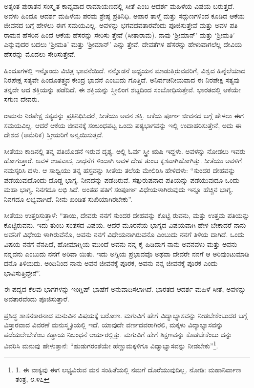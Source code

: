 ಅತ್ಯಂತ ಪುರಾತನ ಸಂಸ್ಕೃತ ಕಾವ್ಯವಾದ ರಾಮಾಯಣದಲ್ಲಿ ಸೀತೆ ಎಂಬ ಆದರ್ಶ ಮಹಿಳೆಯ ವಿಷಯ ಬರುತ್ತದೆ. ಅವಳು ಹಿಂದೂ ಆದರ್ಶ ಮಹಿಳೆಯ ಪರಮ ಶ್ರೇಷ್ಠ ಪ್ರತಿನಿಧಿ. ಅಪಾರ ತಾಳ್ಮೆ ಮತ್ತು ಸದ್ಗುಣಗಳಿಂದ ಕೂಡಿದ ಆಕೆಯ ಜೀವನದ ಬಗ್ಗೆ ಹೇಳಲು ಈಗ ಸಮಯವಿಲ್ಲ. ಅವಳನ್ನು ಭಗವದವತಾರವೆಂದು ಪೂಜಿಸುತ್ತೇವೆ ಮತ್ತು ಅವಳ ಪತಿ ರಾಮನ ಹೆಸರಿನ ಹಿಂದೆ ಆಕೆಯ ಹೆಸರನ್ನು ಸೇರಿಸು ತ್ತೇವೆ (ಸೀತಾರಾಮ). ನಾವು ‘ಶ‍್ರೀಮಾನ್’ ಮತ್ತು ‘ಶ‍್ರೀಮತಿ’ ಎನ್ನುವುದರ ಬದಲು ‘ಶ‍್ರೀಮತಿ’ ಮತ್ತು ‘ಶ‍್ರೀಮಾನ್’ ಎನ್ನು ತ್ತೇವೆ. ದೇವತೆಗಳ ಹೆಸರನ್ನು ಹೇಳುವಾಗಲೆಲ್ಲ ದೇವಿಯ ಹೆಸರನ್ನು ಮೊದಲು ಸೇರಿಸುತ್ತೇವೆ.

ಹಿಂದೂಗಳಲ್ಲಿ ಇನ್ನೊಂದು ವಿಚಿತ್ರ ಭಾವನೆಯಿದೆ. ನನ್ನೊಡನೆ ಅಧ್ಯಯನ ಮಾಡುತ್ತಿರುವವರಿಗೆ, ವಿಶ್ವದ ಹಿನ್ನೆಲೆಯಾದ ನಿರಪೇಕ್ಷ ಸತ್ಯವೇ ಹಿಂದೂತತ್ತ್ವದ ಕೇಂದ್ರ ಭಾವನೆ ಎಂಬುದು ಗೊತ್ತಿದೆ. ಅನಿರ್ವಚನೀಯವಾದ ಈ ನಿರಪೇಕ್ಷ ಸತ್ಯವು ತನ್ನದೇ ಆದ ಶಕ್ತಿಯನ್ನು ಪಡೆದಿದೆ. ಈ ಶಕ್ತಿಯನ್ನು ಸ್ತ್ರೀಲಿಂಗ ಶಬ್ದದಿಂದ ಸಂಬೋಧಿಸುತ್ತೇವೆ. ಭಾರತದಲ್ಲಿ ಆಕೆಯೇ ಸಗುಣ ದೇವರು.

ರಾಮನು ನಿರಪೇಕ್ಷ ಸತ್ಯವನ್ನು ಪ್ರತಿನಿಧಿಸಿದರೆ, ಸೀತೆಯು ಅವನ ಶಕ್ತಿ. ಆಕೆಯ ಪೂರ್ಣ ಜೀವನದ ಬಗ್ಗೆ ಹೇಳಲು ಈಗ ಸಮಯವಿಲ್ಲ. ಆದರೆ ಆಕೆಯ ಜೀವನಕ್ಕೆ ಸಂಬಂಧಪಟ್ಟ ಒಂದು ಪಠ್ಯಭಾಗವನ್ನು ಇಲ್ಲಿ ಉದಾಹರಿಸುತ್ತೇನೆ, ಅದು ಈ ದೇಶದ (ಅಮೆರಿಕ) ಸ್ತ್ರೀಯರಿಗೆ ಅನ್ವಯಿಸುತ್ತದೆ.

ಸೀತೆಯು ಕಾಡಿನಲ್ಲಿ ತನ್ನ ಪತಿಯೊಡನೆ ಇರುವ ದೃಶ್ಯ. ಅಲ್ಲಿ ಓರ್ವ ಸ್ತ್ರೀ ಋಷಿ ಇದ್ದಳು. ಅವಳನ್ನು ನೋಡಲು ಇವರು ಹೋಗುತ್ತಾರೆ. ಅವಳ ಉಪವಾಸ, ಸಾಧನೆಗ ಳಿಂದಾಗಿ ಅವಳ ದೇಹ ತುಂಬ ಕೃಶವಾಗಿಹೋಗಿತ್ತು. ಸೀತೆಯು ಅವಳಿಗೆ ನಮಸ್ಕರಿಸಿ ದಳು. ಆ ಸಾಧ್ವಿಯು ತನ್ನ ಹಸ್ತವನ್ನು ಸೀತೆಯ ತಲೆಯ ಮೇಲಿರಿಸಿ ಹೇಳಿದಳು: “ಸುಂದರ ದೇಹವನ್ನು ಪಡೆಯುವುದೊಂದು ದೊಡ್ಡ ಭಾಗ್ಯ. ನೀನದನ್ನು ಪಡೆದಿರುವೆ. ಸತ್ಪುರುಷನಾದ ಪತಿಯನ್ನು ಪಡೆಯುವುದೂ ಒಂದು ಮಹಾ ಭಾಗ್ಯ. ನಿನಗದೂ ಲಭಿ ಸಿದೆ. ಅಂತಹ ಪತಿಗೆ ಸಂಪೂರ್ಣ ವಿಧೇಯಳಾಗಿರುವುದು ಇನ್ನೂ ಹೆಚ್ಚಿನ ಭಾಗ್ಯ. ನಿನಗದೂ ಲಭ್ಯವಾಗಿದೆ. ನೀನು ಖಂಡಿತ ಸುಖಿಯಾಗಿರಬೇಕು”.

ಸೀತೆಯು ಉತ್ತರಿಸುತ್ತಾಳೆ: “ತಾಯಿ, ದೇವರು ನನಗೆ ಸುಂದರ ದೇಹವನ್ನು ಕೊಟ್ಟಿ ರುವನು, ಮತ್ತು ಉತ್ತಮ ಪತಿಯನ್ನು ಕೊಟ್ಟಿರುವನು. ಇದು ತುಂಬ ಸಂತಸದ ವಿಷಯ. ಆದರೆ ಮೂರನೆಯ ಭಾಗ್ಯದ ವಿಷಯವಾಗಿ ಹೇಳ ಬೇಕಾದರೆ ನಾನು ಅವನಿಗೆ ವಿಧೇಯ ಳಾಗಿರುವೆನೊ, ಅವನು ನನಗೆ ವಿಧೇಯನಾಗಿರುವನೊ ಎಂಬುದು ನನಗೆ ತಿಳಿಯ ದಾಗಿದೆ. ಒಂದು ವಿಷಯ ನನಗೆ ನೆನಪಿದೆ, ಹೋಮಾಗ್ನಿಯ ಮುಂದೆ ಅವನು ನನ್ನ ಕೈ ಹಿಡಿದಾಗ ನಾನು ಅವನವಳು ಮತ್ತು ಅವನು ನನ್ನವನು ಎಂಬುದು ನನಗೆ ಅರಿವಾ ಯಿತು. ಇದು ಅಗ್ನಿಯ ಪ್ರಭಾವವೊ ಅಥವಾ ದೇವರೇ ನನಗೆ ಆ ಅರಿವುಂಟುಮಾಡಿ ದನೊ ತಿಳಿಯದು. ಅಂದಿನಿಂದ ನಾನು ಅವನ ಜೀವನಕ್ಕೆ ಪೂರಕ, ಅವನು ನನ್ನ ಜೀವನಕ್ಕೆ ಪೂರಕ ಎಂದು ಭಾವಿಸುತ್ತಿದ್ದೇನೆ”.

ಈ ಪದ್ಯದ ಕೆಲವು ಭಾಗಗಳನ್ನು ಇಂಗ್ಲಿಷ್ ಭಾಷೆಗೆ ಅನುವಾದಿಸಲಾಗಿದೆ. ಭಾರತದ ಆದರ್ಶ ಮಹಿಳೆ ಸೀತೆ, ಅವಳನ್ನು ಅವತಾರವೆಂದು ಪೂಜಿಸುತ್ತಾರೆ.

ಪ್ರಸಿದ್ಧ ಶಾಸನಕಾರನಾದ ಮನುವಿನ ವಿಷಯಕ್ಕೆ ಬರೋಣ. ಮಗುವಿಗೆ ಹೇಗೆ ವಿದ್ಯಾಭ್ಯಾಸವನ್ನು ನೀಡಬೇಕೆಂಬುದರ ಬಗ್ಗೆ ವಿಸ್ತಾರವಾದ ವಿವರಣೆ ಮನುಸ್ಮೃತಿಯಲ್ಲಿ ಇದೆ. ಯಾವುದೇ ವರ್ಣದವರಾಗಿರಲಿ, ಮಕ್ಕಳು ವಿದ್ಯಾಭ್ಯಾಸವನ್ನು ಪಡೆಯಲೇಬೇಕೆಂಬ ಕಡ್ಡಾಯ ನಿಬಂಧನೆ ಆರ್ಯರಲ್ಲಿತ್ತು. ಮಗುವಿಗೆ ಹೇಗೆ ಶಿಕ್ಷಣವನ್ನು ಕೊಡಬೇಕೆಂಬು ದನ್ನು ವಿವರಿಸಿ ಮನುವು ಹೇಳುತ್ತಾನೆ: “ಹುಡುಗರಂತೆಯೇ ಹೆಣ್ಣುಮಕ್ಕಳಿಗೂ ವಿದ್ಯಾಭ್ಯಾಸವನ್ನು ನೀಡಬೇಕು”\footnote{1. ಈ ವಾಕ್ಯವು ಈಗ ಲಭ್ಯವಿರುವ ಮನ ಸಂಹಿತೆಯಲ್ಲಿ ನಮಗೆ ದೊರೆಯುವುದಿಲ್ಲ. ನೋಡಿ: ಮಹಾನಿರ್ವಾಣ ತಂತ್ರ, ೮.೪೭}.

